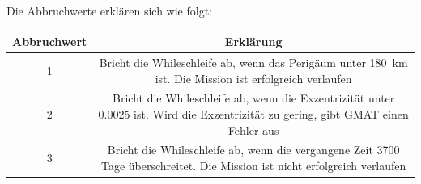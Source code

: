 Die Abbruchwerte erklären sich wie folgt:\\
\begin{center}
\begin{tabular}{c| c{5cm}}
Abbruchwert & Erklärung \\
\hline
1 &  \multicolumn{2}{p{4cm}|}{\raggedright Bricht die Whileschleife ab, wenn das Perigäum unter \SI{180}{\km} ist. Die Mission ist erfolgreich verlaufen}\\
2 &  \multicolumn{2}{p{4cm}|}{\raggedright Bricht die Whileschleife ab, wenn die Exzentrizität unter 0.0025 ist. Wird die Exzentrizität zu gering, gibt GMAT einen Fehler aus}\\
3 &  \multicolumn{2}{p{4cm}|}{\raggedright Bricht die Whileschleife ab, wenn die vergangene Zeit 3700 Tage überschreitet. Die Mission ist nicht erfolgreich verlaufen}\\
\end{tabular}
\end{center}



